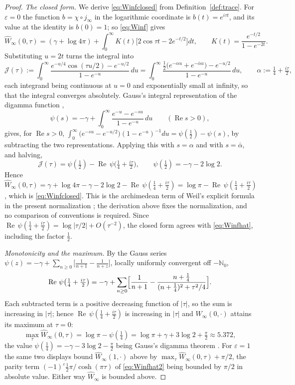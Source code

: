 \documentclass[11pt]{amsart}
\theoremstyle{definition}
\theoremstyle{remark}
\newcommand{\N}{\mathbb N}
\newcommand{\Rel}{\operatorname{Re}}
\newcommand{\Wh}{\widehat{W}}
\begin{document}
\begin{proof}
\emph{The closed form.}  We derive \eqref{eq:Winfclosed} from
Definition~\ref{def:trace}.  For $\varepsilon=0$ the function
$b=\chi\circ j_{\infty}$ in the logarithmic coordinate is $b(t)=e^{i\tau t}$,
and its value at the identity is $b(0)=1$; so \eqref{eq:Winf} gives
\[
\Wh_{\infty}(0,\tau)=(\gamma+\log4\pi)+\int_0^{\infty}K(t)
\bigl[2\cos\tau t-2e^{-t/2}\bigr]dt,\qquad
K(t)=\frac{e^{-t/2}}{1-e^{-2t}} .
\]
Substituting $u=2t$ turns the integral into
\[
\mathcal J(\tau):=\int_0^{\infty}
\frac{e^{-u/4}\cos(\tau u/2)-e^{-u/2}}{1-e^{-u}}\,du
=\int_0^{\infty}\frac{\tfrac12\bigl(e^{-\alpha u}+e^{-\bar\alpha u}\bigr)
-e^{-u/2}}{1-e^{-u}}\,du,\qquad \alpha:=\tfrac14+\tfrac{i\tau}{2},
\]
each integrand being continuous at $u=0$ and exponentially small at infinity,
so that the integral converges absolutely.  Gauss's integral representation
of the digamma function \cite[\S5.9]{DLMF},
\[
\psi(s)=-\gamma+\int_0^{\infty}\frac{e^{-u}-e^{-su}}{1-e^{-u}}\,du
\qquad(\Rel s>0),
\]
gives, for $\Rel s>0$,
$\int_0^{\infty}\bigl(e^{-su}-e^{-u/2}\bigr)(1-e^{-u})^{-1}du
=\psi(\tfrac12)-\psi(s)$, by subtracting the two representations.  Applying
this with $s=\alpha$ and with $s=\bar\alpha$, and halving,
\[
\mathcal J(\tau)=\psi(\tfrac12)-\Rel\,\psi\bigl(\tfrac14+\tfrac{i\tau}{2}\bigr),
\qquad \psi(\tfrac12)=-\gamma-2\log2 .
\]
Hence $\Wh_{\infty}(0,\tau)=\gamma+\log4\pi-\gamma-2\log2-
\Rel\,\psi(\tfrac14+\tfrac{i\tau}{2})=\log\pi-
\Rel\,\psi(\tfrac14+\tfrac{i\tau}{2})$, which is \eqref{eq:Winfclosed}.  This
is the archimedean term of Weil's explicit formula in the present
normalization \cite{Weil1952,CCWeilArch}; the derivation above fixes the
normalization, and no comparison of conventions is required.  Since
$\Rel\,\psi(\tfrac14+\tfrac{i\tau}{2})=\log|\tau/2|+O(\tau^{-2})$, the closed
form agrees with \eqref{eq:Winfhat}, including the factor $\tfrac12$.

\emph{Monotonicity and the maximum.}  By the Gauss series
$\psi(z)=-\gamma+\sum_{n\ge0}\bigl[\tfrac1{n+1}-\tfrac1{n+z}\bigr]$, locally
uniformly convergent off $-\N_0$,
\[
\Rel\,\psi\bigl(\tfrac14+\tfrac{i\tau}{2}\bigr)
=-\gamma+\sum_{n\ge0}\Bigl[\frac1{n+1}
-\frac{n+\tfrac14}{(n+\tfrac14)^{2}+\tau^{2}/4}\Bigr].
\]
Each subtracted term is a positive decreasing function of $|\tau|$, so the sum
is increasing in $|\tau|$; hence $\Rel\,\psi(\tfrac14+\tfrac{i\tau}{2})$ is
increasing in $|\tau|$ and $\Wh_{\infty}(0,\cdot)$ attains its maximum at
$\tau=0$:
\begin{equation}\label{eq:maxarch}
\max_{\tau}\Wh_{\infty}(0,\tau)=\log\pi-\psi(\tfrac14)
=\log\pi+\gamma+3\log2+\tfrac{\pi}{2}\approx5.372 ,
\end{equation}
the value $\psi(\tfrac14)=-\gamma-3\log2-\tfrac{\pi}{2}$ being Gauss's digamma
theorem \cite[\S5.4(iii)]{DLMF}.  For $\varepsilon=1$ the same two displays
bound $\Wh_{\infty}(1,\cdot)$ above by $\max_{\tau}\Wh_{\infty}(0,\tau)+\pi/2$,
the parity term $(-1)^{\varepsilon}\tfrac12\pi/\cosh(\pi\tau)$ of
\eqref{eq:Winfhat2} being bounded by $\pi/2$ in absolute value.
Either way $\Wh_{\infty}$ is bounded above.


\end{proof}
\end{document}
